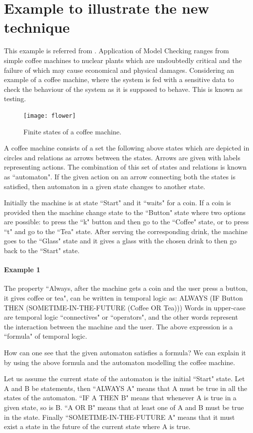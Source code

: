 \documentclass[a4paper,12pt]{report}
\begin{document}
\section{Example to illustrate the new technique}
\label{Example}
This example is referred from \cite{J.M.Wing1996}.
Application of Model Checking ranges from simple coffee machines to nuclear plants which are undoubtedly critical and the failure of which may cause economical and physical damages. Considering an example of a coffee machine, where the system is fed with a sensitive data to check the behaviour of the system as it is supposed to behave. This is known as testing. 
\begin{figure}[ht!]
\centering
 \texttt{[image: flower]}
\caption{Finite states of a coffee machine.}
\end{figure}
 A coffee machine consists of a set the following above states which are depicted in circles and relations as arrows between the states. Arrows are given with labels representing actions. The combination of this set of states and relations is known as ``automaton". If the given action on an arrow connecting both the states is satisfied, then automaton in a given state changes to another state. 
 
Initially the machine is at state ``Start" and it ``waits" for a coin. If a coin is provided then the machine change state to the ``Button" state where two options are possible: to press the ``k" button and then go to the ``Coffee" state, or to press ``t" and go to the ``Tea" state. After serving the corresponding drink, the machine goes to the ``Glass" state and it gives a glass with the chosen drink to then go back to the ``Start" state.
\paragraph{Example 1}
The property ``Always, after the machine gets a coin and the user press a button, it gives coffee or tea", can be written in temporal logic as:
ALWAYS (IF Button THEN (SOMETIME-IN-THE-FUTURE (Coffee OR Tea)))
Words in upper-case are temporal logic ``connectives" or ``operators", and the other words represent the interaction between the machine and the user. The above expression is a ``formula" of temporal logic.

How can one see that the given automaton satisfies a formula? We can explain it by using the above formula and the automaton modelling the coffee machine.

Let us assume the current state of the automaton is the initial ``Start" state. Let A and B be statements, then ``ALWAYS A" means that A must be true in all the states of the automaton. ``IF A THEN B" means that whenever A is true in a given state, so is B. ``A OR B" means that at least one of A and B must be true in the state. Finally ``SOMETIME-IN-THE-FUTURE A" means that it must exist a state in the future of the current state where A is true.
\end{document}
